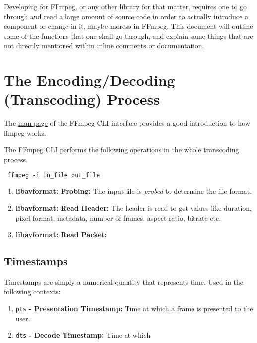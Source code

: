 \documentclass{article}
\begin{document}
Developing for FFmpeg, or any other library for that matter, requires one to go through and read a large amount of source code in order to actually introduce a component or change in it, maybe moreso in FFmpeg. This document will outline some of the functions that one shall go through, and explain some things that are not directly mentioned within inline comments or documentation.

\section{The Encoding/Decoding (Transcoding) Process}



The \href{https://ffmpeg.org/ffmpeg.html\#toc-Detailed-description}{man page} 
of the FFmpeg CLI interface provides a good introduction to how ffmpeg works.

The FFmpeg CLI performs the following operations in the whole transcoding process.

\texttt{ ffmpeg -i in\_file out\_file }

\begin{enumerate}
\item \textbf{libavformat: Probing:} The input file is \emph{probed} to 
      determine the file format.
\item \textbf{libavformat: Read Header:} The header is read to get values like 
      duration, pixel format, metadata, number of frames, aspect ratio, bitrate 
      etc.
\item \textbf{libavformat: Read Packet:} 
\end{enumerate}

\subsection{Timestamps}

Timestamps are simply a numerical quantity that represents time. Used in the following contexts:

\begin{enumerate}
\item \texttt{pts} \textbf{- Presentation Timestamp:} Time at which a frame is 
      presented to the user.
\item \texttt{dts} \textbf{- Decode Timestamp:} Time at which 
\end{enumerate}
\end{document}
